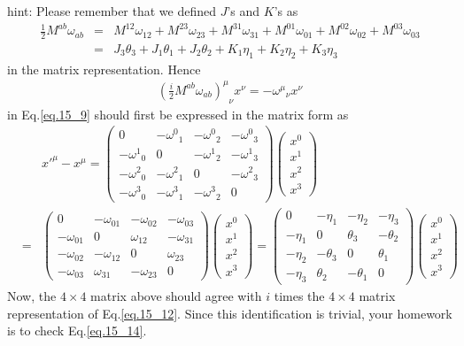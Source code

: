 \documentclass[12pt]{article}
\begin{document}
{hint: Please remember that we defined $J$'s and $K$'s as
\begin{eqnarray}
  \frac{1}{2} M^{ab} \omega_{ab}
  &=& M^{12}\omega_{12} +M^{23}\omega_{23} +M^{31}\omega_{31} +M^{01}\omega_{01} +M^{02}\omega_{02} +M^{03}\omega_{03} \\
  &=& J_3 \theta_3 +J_1 \theta_1 +J_2 \theta_2 +K_1 \eta_1 +K_2 \eta_2 +K_3 \eta_3 \label{eq.15_12}
\end{eqnarray}
  in the matrix representation. Hence
\begin{eqnarray}
  {(\frac{i}{2} M^{ab} \omega_{ab})^\mu}_\nu x^\nu = - {\omega^\mu}_\nu x^\nu \label{eq.15_13}
\end{eqnarray}
  in Eq.\ref{eq.15_9} should first be expressed in the matrix form as
\begin{eqnarray}
  &&x'^\mu - x^\mu =
  \begin{pmatrix}
    0 &   -{\omega^0}_1 & -{\omega^0}_2 & -{\omega^0}_3 \\
    -{\omega^1}_0 & 0 & -{\omega^1}_2 & -{\omega^1}_3 \\
    -{\omega^2}_0 & -{\omega^2}_1 &  0 & -{\omega^2}_3 \\
    -{\omega^3}_0 & -{\omega^3}_1 &  -{\omega^3}_2 &  0  
  \end{pmatrix}
  \begin{pmatrix}
    x^0 \\ x^1 \\ x^2 \\ x^3
  \end{pmatrix} \\
  &=&
  \begin{pmatrix}
    0 &  -\omega_{01} & -\omega_{02} & -\omega_{03} \\
    -\omega_{01} & 0 & \omega_{12} & -\omega_{31} \\
    -\omega_{02} & -\omega_{12} &  0 & \omega_{23} \\
    -\omega_{03} & \omega_{31} &  -\omega_{23} &  0  
  \end{pmatrix}
  \begin{pmatrix}
    x^0 \\ x^1 \\ x^2 \\ x^3
  \end{pmatrix}
  =
  \begin{pmatrix}
    0 &  -\eta_{1} & -\eta_{2} & -\eta_{3} \\
    -\eta_{1} & 0 & \theta_{3} & -\theta_{2} \\
    -\eta_{2} & -\theta_{3} &  0 & \theta_{1} \\
    -\eta_{3} & \theta_{2} &  -\theta_{1} &  0  
  \end{pmatrix}
  \begin{pmatrix}
    x^0 \\ x^1 \\ x^2 \\ x^3
  \end{pmatrix} \label{eq.15_14}
\end{eqnarray}
  Now, the $4\times 4$ matrix above should agree with $i$ times the $4\times 4$ matrix representation of Eq.\ref{eq.15_12}. Since this identification is trivial, your homework is to check Eq.\ref{eq.15_14}.

}
\end{document}
